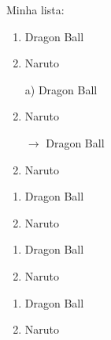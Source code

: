 \documentclass{article}
\begin{document}

Minha lista:

\begin{enumerate}
  \item Dragon Ball
  \item Naruto
\end{enumerate}

\begin{enumerate}
  \item[a)] Dragon Ball
  \item Naruto
\end{enumerate}

\begin{enumerate}
  \item[$\rightarrow$] Dragon Ball      %
  \item Naruto
\end{enumerate}

\begin{enumerate}[label=\alph*] %
  \item Dragon Ball
  \item Naruto
\end{enumerate}

\begin{enumerate}[label=\roman*]
  \item Dragon Ball
  \item Naruto
\end{enumerate}

\begin{enumerate}[label=(\roman*)]
  \item Dragon Ball
  \item Naruto
\end{enumerate}
\end{document}
